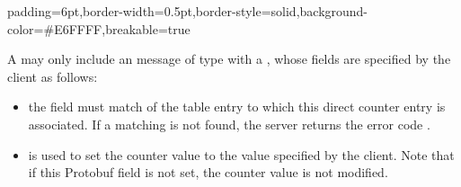 \documentclass[11pt]{article}
\begin{document}
{%
\begin{mdbmargintb}{6pt}{6pt}%
\begin{mdblock}{padding=6pt,border-width=0.5pt,border-style=solid,background-color=\#E6FFFF,breakable=true}%
\begin{mdpre}%
\end{mdpre}%
\end{mdblock}%
\end{mdbmargintb}%

\noindent{}A  may only include an  message of type  with a
, whose fields are specified by the client as follows:%

\begin{itemize}%

\item{}
the  field must match  of the table entry
to which this direct counter entry is associated. If a matching 
is not found, the server returns the error code .%

\item{}
 is used to set the counter value to the value specified by the
client. Note that if this Protobuf field is not set, the counter value is not
modified.%
\end{itemize}%

}
\end{document}
